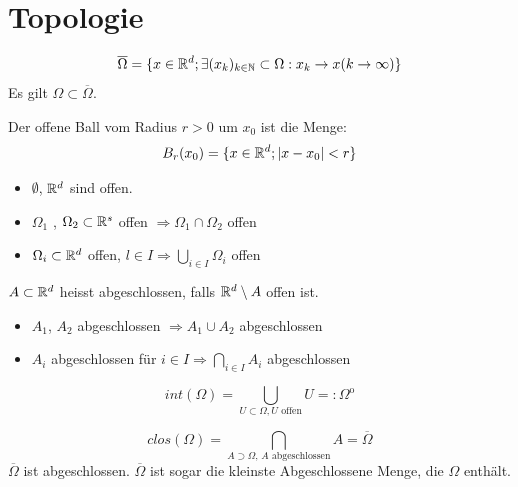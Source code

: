 \documentclass[a4paper]{article}
\begin{document}
\section{Topologie}	
\begin{multicols}{2}

		\begin{fdef}
			$$\overline{\Omega} = \{x \in \mathbb{R}^d; \exists (x_k)_{k\in \mathbb{N}} \subset \Omega: x_k \rightarrow x (k \rightarrow \infty) \}$$
			Es gilt $\Omega \subset \overline{\Omega}$.
		\end{fdef}
		\begin{fdef}
			Der offene Ball vom Radius $r>0$ um $x_0$ ist die Menge:
				$$B_r(x_0) = \{ x \in \mathbb{R}^d; |x-x_0| < r \}$$	
		\end{fdef}
		
		\begin{fsatz}
			\begin{itemize}
			\item $\emptyset$, $\mathbb{R}^d$ sind offen. 
			\item $\Omega_1$ , $\Omega_2 \subset \mathbb{R}^s$ offen $\Rightarrow \Omega_1 \cap \Omega_2$ offen
			\item $\Omega_i \subset \mathbb{R}^d$ offen, $l \in I \Rightarrow \bigcup_{i \in I} \Omega_i$ offen
			\end{itemize}
		\end{fsatz}

		
		\begin{fdef}[Abgeschlossenheit]
			$A \subset \mathbb{R}^d$ heisst abgeschlossen, falls $\mathbb{R}^d \setminus A$ offen ist.
		\end{fdef}

		\begin{fsatz}
			\begin{itemize}
			\item $A_1$, $A_2$ abgeschlossen $\Rightarrow A_1 \cup A_2$ abgeschlossen
			\item $A_i$ abgeschlossen für $i \in I \Rightarrow \bigcap_{i \in I} A_i$ abgeschlossen
			\end{itemize}
		\end{fsatz}

		\begin{fdef}
			$$int(\Omega) = \underset{U \subset \Omega, U \text{ offen}}{\bigcup} U =: \Omega^\text{o}$$
		\end{fdef}

		\begin{fdef}
			$$clos(\Omega) = \underset{A\supset \Omega \text{, $A$ abgeschlossen}}{\bigcap} A = \overline{\Omega}$$
			$\overline{\Omega}$ ist abgeschlossen. $\overline{\Omega}$ ist sogar die kleinste Abgeschlossene Menge, die $\Omega$ enthält.
		\end{fdef}
\end{multicols}
\end{document}
